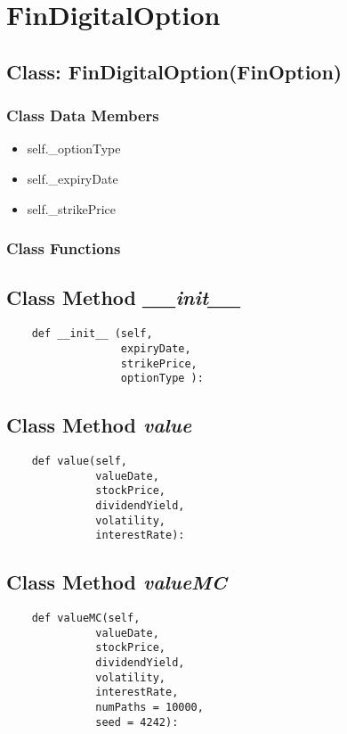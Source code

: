 \documentclass[twoside,11pt]{book}
\begin{document}
\newpage
\section{FinDigitalOption}

\subsection{Class: FinDigitalOption(FinOption)}


\subsubsection{Class Data Members}
\begin{itemize}
\item{self.\_optionType}
\item{self.\_expiryDate}
\item{self.\_strikePrice}
\end{itemize}

\subsubsection{Class Functions}

\subsection{Class Method {\it \_\_init\_\_ }}


\begin{lstlisting}
    def __init__ (self,
                  expiryDate,
                  strikePrice,
                  optionType ):
\end{lstlisting}

\subsection{Class Method {\it value}}


\begin{lstlisting}
    def value(self,
              valueDate,
              stockPrice,
              dividendYield,
              volatility,
              interestRate):
\end{lstlisting}

\subsection{Class Method {\it valueMC}}


\begin{lstlisting}
    def valueMC(self,
              valueDate,
              stockPrice,
              dividendYield,
              volatility,
              interestRate,
              numPaths = 10000,
              seed = 4242):
\end{lstlisting}
\end{document}

